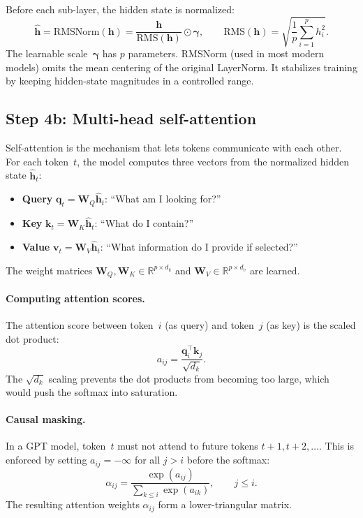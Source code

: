 \documentclass[11pt, twoside, openright]{memoir}
\begin{document}
Before each sub-layer, the hidden state is normalized:
\[
  \hat{\mathbf{h}} = \text{RMSNorm}(\mathbf{h})
  = \frac{\mathbf{h}}{\text{RMS}(\mathbf{h})} \odot \boldsymbol{\gamma},
  \qquad
  \text{RMS}(\mathbf{h}) = \sqrt{\frac{1}{p}\sum_{i=1}^{p} h_i^2}.
\]
The learnable scale~$\boldsymbol{\gamma}$ has $p$ parameters.  RMSNorm
(used in most modern models) omits the mean centering of the original
LayerNorm.  It stabilizes training by keeping hidden-state magnitudes in
a controlled range.

\subsection{Step 4b: Multi-head self-attention}

Self-attention is the mechanism that lets tokens communicate with each other.
For each token~$t$, the model computes three vectors from the normalized
hidden state $\hat{\mathbf{h}}_t$:

\begin{itemize}[nosep]
\item \textbf{Query} $\mathbf{q}_t = \mathbf{W}_Q \hat{\mathbf{h}}_t$:
  ``What am I looking for?''
\item \textbf{Key} $\mathbf{k}_t = \mathbf{W}_K \hat{\mathbf{h}}_t$:
  ``What do I contain?''
\item \textbf{Value} $\mathbf{v}_t = \mathbf{W}_V \hat{\mathbf{h}}_t$:
  ``What information do I provide if selected?''
\end{itemize}

The weight matrices $\mathbf{W}_Q, \mathbf{W}_K \in \mathbb{R}^{p \times d_k}$
and $\mathbf{W}_V \in \mathbb{R}^{p \times d_v}$ are learned.

\paragraph{Computing attention scores.}  The attention score between
token~$i$ (as query) and token~$j$ (as key) is the scaled dot product:
\[
  a_{ij} = \frac{\mathbf{q}_i^\top \mathbf{k}_j}{\sqrt{d_k}}.
\]
The $\sqrt{d_k}$ scaling prevents the dot products from becoming too large,
which would push the softmax into saturation.

\paragraph{Causal masking.}  In a GPT model, token~$t$ must not attend to
future tokens $t+1, t+2, \ldots$.  This is enforced by setting
$a_{ij} = -\infty$ for all $j > i$ before the softmax:
\[
  \alpha_{ij} = \frac{\exp(a_{ij})}{\sum_{k \leq i} \exp(a_{ik})},
  \qquad j \leq i.
\]
The resulting attention weights $\alpha_{ij}$ form a lower-triangular matrix.
\end{document}
